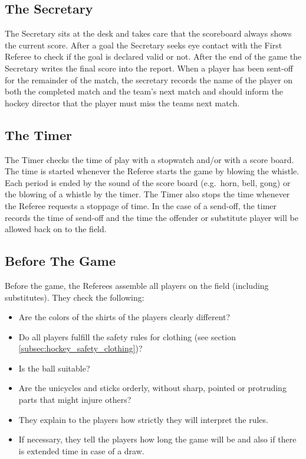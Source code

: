 \subsection{The Secretary}
The Secretary sits at the desk and takes care that the scoreboard always shows the current score.
After a goal the Secretary seeks eye contact with the First Referee to check if the goal is declared valid or not.
After the end of the game the Secretary writes the final score into the report.
When a player has been sent-off for the remainder of the match, the secretary records the name of the player on both the completed match and the team’s next match and should inform the hockey director that the player must miss the teams next match.

\subsection{The Timer}
The Timer checks the time of play with a stopwatch and/or with a score board.
The time is started whenever the Referee starts the game by blowing the whistle.
Each period is ended by the sound of the score board (e.g.\ horn, bell, gong) or the blowing of a whistle by the timer.
The Timer also stops the time whenever the Referee requests a stoppage of time.
In the case of a send-off, the timer records the time of send-off and the time the offender or substitute player will be allowed back on to the field.

\subsection{Before The Game}
Before the game, the Referees assemble all players on the field (including substitutes).
They check the following:
\begin{itemize}
\item Are the colors of the shirts of the players clearly different?
\item Do all players fulfill the safety rules for clothing (see section \ref{subsec:hockey_safety_clothing})?
\item Is the ball suitable?
\item Are the unicycles and sticks orderly, without sharp, pointed or protruding parts that might injure others?
\item They explain to the players how strictly they will interpret the rules.
\item If necessary, they tell the players how long the game will be and also if there is extended time in case of a draw.
\end{itemize}

